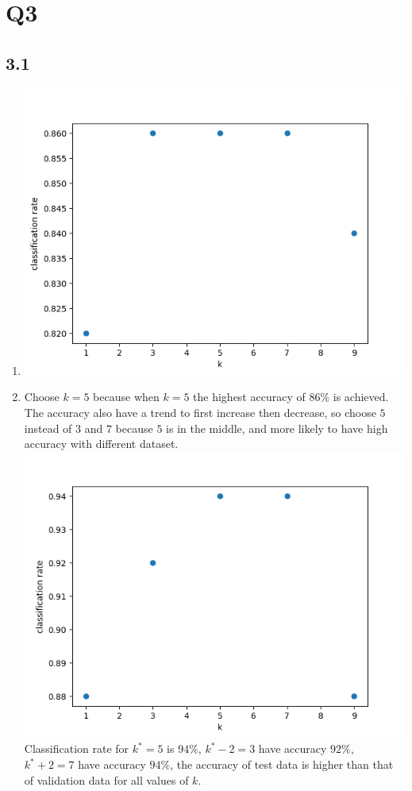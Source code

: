 \documentclass[12pt]{article}
\begin{document}
	\section*{Q3}
	\subsection*{3.1}
	\begin{enumerate}[label=\alph*)]
		\item \includegraphics[scale=0.6]{3.1a.png}
		\item Choose $k=5$ because when $k=5$ the highest accuracy of $86\%$ is achieved. The accuracy also have a trend to first increase then decrease, so choose $5$ instead of $3$ and $7$ because $5$ is in the middle, and more likely to have high accuracy with different dataset.\\
		\includegraphics[scale=0.6]{3.1b.png}\\
		Classification rate for $k^*=5$ is $94\%$, $k^*-2=3$ have accuracy $92\%$, $k^*+2=7$ have accuracy $94\%$, the accuracy of test data is higher than that of validation data for all values of $k$.
	\end{enumerate}
\end{document}
